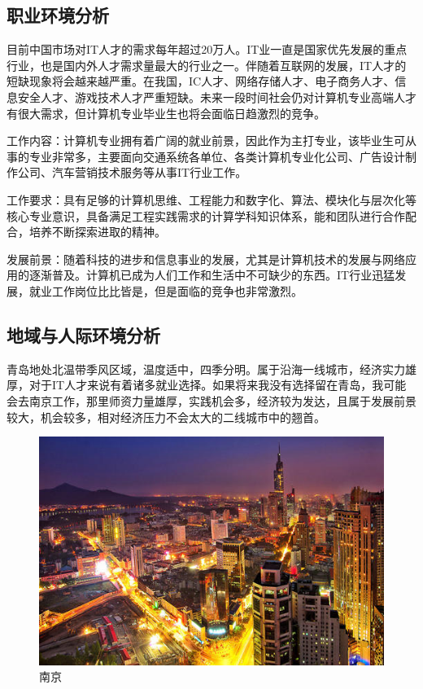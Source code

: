 \documentclass{article}
\begin{document}
\subsection{职业环境分析}
目前中国市场对IT人才的需求每年超过20万人。IT业一直是国家优先发展的重点行业，也是国内外人才需求量最大的行业之一。伴随着互联网的发展，IT人才的短缺现象将会越来越严重。在我国，IC人才、网络存储人才、电子商务人才、信息安全人才、游戏技术人才严重短缺。未来一段时间社会仍对计算机专业高端人才有很大需求，但计算机专业毕业生也将会面临日趋激烈的竞争。\par
工作内容：计算机专业拥有着广阔的就业前景，因此作为主打专业，该毕业生可从事的专业非常多，主要面向交通系统各单位、各类计算机专业化公司、广告设计制作公司、汽车营销技术服务等从事IT行业工作。\par
工作要求：具有足够的计算机思维、工程能力和数字化、算法、模块化与层次化等核心专业意识，具备满足工程实践需求的计算学科知识体系，能和团队进行合作配合，培养不断探索进取的精神。\par
发展前景：随着科技的进步和信息事业的发展，尤其是计算机技术的发展与网络应用的逐渐普及。计算机已成为人们工作和生活中不可缺少的东西。IT行业迅猛发展，就业工作岗位比比皆是，但是面临的竞争也非常激烈。
\par
\subsection{地域与人际环境分析}
青岛地处北温带季风区域，温度适中，四季分明。属于沿海一线城市，经济实力雄厚，对于IT人才来说有着诸多就业选择。如果将来我没有选择留在青岛，我可能会去南京工作，那里师资力量雄厚，实践机会多，经济较为发达，且属于发展前景较大，机会较多，相对经济压力不会太大的二线城市中的翘首。\par
\par 
\begin{figure}[h!]
\centering
\includegraphics[scale=2.8]{u=3926568172,3413445647&fm=26&gp=0}
\caption{南京}
\label{fig:universe}
\end{figure}
\end{document}

